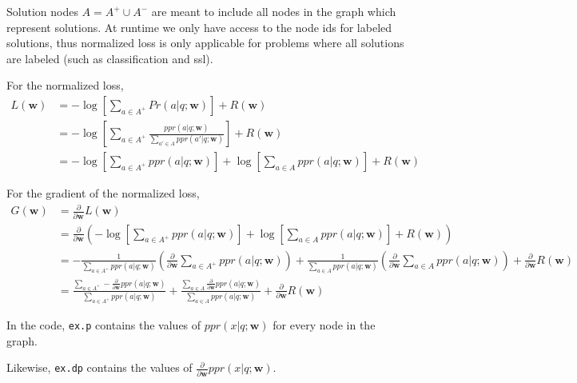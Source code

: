 \documentclass[12pt]{article}
\newcommand{\weightvec}{\textbf{w}}
\newcommand{\vek}[1]{\textbf{#1}}
\newcommand{\ddw}{\frac{\partial}{\partial\vek{w}}}
\begin{document}
Solution nodes $A = A^+ \cup A^-$ are meant to include all nodes in the graph which represent solutions. At runtime we only have access to the node ids for labeled solutions, thus normalized loss is only applicable for problems where all solutions are labeled (such as classification and ssl).

For the normalized loss,
\begin{align}
L(\weightvec) &= -\log\left[ \sum\limits_{a\in A^+} Pr(a | q;\weightvec)\right] + R(\weightvec)\\
&= -\log\left[ \sum\limits_{a\in A^+} \frac{ppr(a|q;\weightvec)}{\sum\limits_{a'\in A} ppr(a' | q;\weightvec)}\right] + R(\weightvec)\\
&= -\log\left[ \sum\limits_{a\in A^+} ppr(a|q;\weightvec)\right] + \log\left[\sum\limits_{a\in A} ppr(a|q;\weightvec)\right] + R(\weightvec)
\end{align}

For the gradient of the normalized loss,
\begin{align}
G(\weightvec) &= \ddw L(\weightvec)\\
&= \ddw \left( -\log\left[ \sum\limits_{a\in A^+} ppr(a|q;\weightvec)\right] + \log\left[\sum\limits_{a\in A} ppr(a|q;\weightvec)\right] + R(\weightvec) \right)\\
&= -\frac{1}{\sum\limits_{a\in A^+} ppr(a|q;\weightvec)}\left(\ddw \sum\limits_{a\in A^+} ppr(a|q;\weightvec)\right) + \frac{1}{\sum\limits_{a\in A} ppr(a|q;\weightvec)}\left(\ddw \sum\limits_{a\in A} ppr(a|q;\weightvec)\right) + \ddw R(\weightvec)\\
&=\frac{\sum\limits_{a\in A^+} - \ddw ppr(a|q;\weightvec)}{\sum\limits_{a\in A^+} ppr(a|q;\weightvec)} + \frac{\sum\limits_{a\in A} \ddw ppr(a|q;\weightvec)}{\sum\limits_{a\in A} ppr(a|q;\weightvec)} + \ddw R(\weightvec)
\end{align}

In the code, {\tt ex.p} contains the values of $ppr(x|q;\weightvec)$ for every node in the graph.

Likewise, {\tt ex.dp} contains the values of $\ddw ppr(x|q;\weightvec)$.
\end{document}
